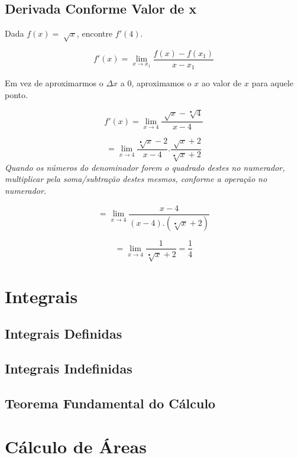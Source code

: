 \documentclass[ ]{article}
\begin{document}
	\subsection{Derivada Conforme Valor de x}
	Dada $f(x)=\sqrt[]{x}$, encontre $f'(4)$.

	$$f'(x)=\lim_{x\to x_1}\dfrac{f(x)-f(x_1)}{x-x_1}$$	

	Em vez de aproximarmos o $\Delta x$ a $0$, aproximamos o $x$ ao valor de $x$ para aquele ponto.

	$$f'(x) = \lim_{x\to 4}\dfrac{\sqrt[ ]{x}-\sqrt[•]{4}}{x-4}$$
	
	$$= \lim_{x\to 4}\dfrac{\sqrt[•]{x}-2}{x-4}.\dfrac{\sqrt[]{x}+2}{\sqrt[•]{x}+2}$$
	\textit{Quando os números do denominador forem o quadrado destes no numerador, multiplicar pela soma/subtração destes mesmos, conforme a operação no numerador.}
	
	$$= \lim_{x\to 4}\dfrac{x-4}{(x-4).(\sqrt[•]{x}+2)}$$
	
	$$= \lim_{x\to 4}\dfrac{1}{\sqrt[•]{x}+2} = \dfrac{1}{4}$$
	
	
\newpage
\section{Integrais}
	\subsection{Integrais Definidas}
	\subsection{Integrais Indefinidas}
	\subsection{Teorema Fundamental do Cálculo}
\section{Cálculo de Áreas}
	
\end{document}
